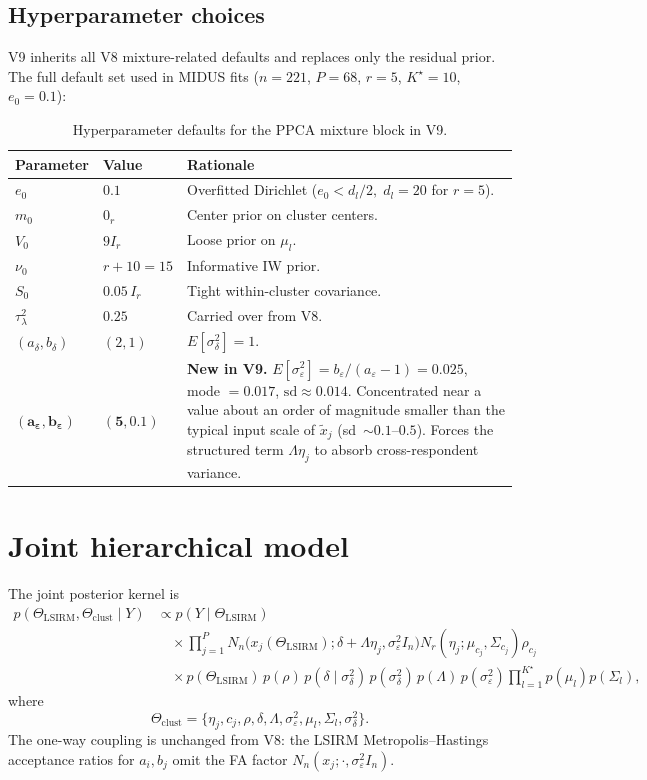 \documentclass[11pt]{article}
\begin{document}
\subsection{Hyperparameter choices}

V9 inherits all V8 mixture-related defaults and replaces only the
residual prior. The full default set used in MIDUS fits ($n=221$,
$P=68$, $r=5$, $K^\star=10$, $e_0=0.1$):

\begin{table}[h]
\centering
\begin{tabular}{lll}
\toprule
Parameter & Value & Rationale \\
\midrule
$e_0$           & $0.1$       & Overfitted Dirichlet ($e_0<d_l/2,\;d_l=20$ for $r=5$). \\
$m_0$           & $0_r$       & Center prior on cluster centers. \\
$V_0$           & $9I_r$      & Loose prior on $\mu_l$. \\
$\nu_0$         & $r+10=15$   & Informative IW prior. \\
$S_0$           & $0.05\,I_r$ & Tight within-cluster covariance. \\
$\tau_\lambda^2$ & $0.25$     & Carried over from V8. \\
$(a_\delta,b_\delta)$ & $(2,1)$ & $E[\sigma_\delta^2]=1$.\\
\midrule
$\bm{(a_\varepsilon,b_\varepsilon)}$ & $\bm{(5,0.1)}$ &
\textbf{New in V9.} $E[\sigma_\varepsilon^2]=b_\varepsilon/(a_\varepsilon-1)=0.025$,
mode $=0.017$, $\mathrm{sd}\approx 0.014$.
Concentrated near a value about an order of magnitude smaller than the
typical input scale of $\widetilde x_j$ (sd~$\sim 0.1$--$0.5$). Forces
the structured term $\Lambda\eta_j$ to absorb cross-respondent variance. \\
\bottomrule
\end{tabular}
\caption{Hyperparameter defaults for the PPCA mixture block in V9.}
\end{table}

\section{Joint hierarchical model}

The joint posterior kernel is
\begin{align*}
p(\Theta_{\mathrm{LSIRM}},\Theta_{\mathrm{clust}}\mid Y)
&\propto
p(Y\mid\Theta_{\mathrm{LSIRM}})\\
&\quad\times
\prod_{j=1}^P
N_n\!\bigl(x_j(\Theta_{\mathrm{LSIRM}});\delta+\Lambda\eta_j,\sigma_\varepsilon^2 I_n\bigr)
N_r(\eta_j;\mu_{c_j},\Sigma_{c_j})\rho_{c_j}\\
&\quad\times
p(\Theta_{\mathrm{LSIRM}})\,p(\rho)\,
p(\delta\mid\sigma_\delta^2)\,p(\sigma_\delta^2)\,p(\Lambda)\,p(\sigma_\varepsilon^2)
\prod_{l=1}^{K^\star}p(\mu_l)p(\Sigma_l),
\end{align*}
where
\[
\Theta_{\mathrm{clust}}=\{\eta_j,c_j,\rho,\delta,\Lambda,\sigma_\varepsilon^2,\mu_l,\Sigma_l,\sigma_\delta^2\}.
\]
The one-way coupling is unchanged from V8: the LSIRM Metropolis--Hastings
acceptance ratios for $a_i,b_j$ omit the FA factor $N_n(x_j;\cdot,\sigma_\varepsilon^2 I_n)$.
\end{document}
